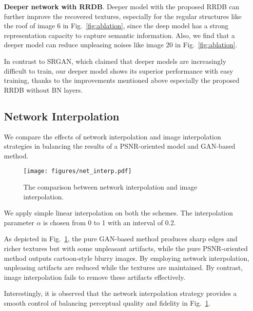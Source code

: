 \documentclass[runningheads]{llncs}
\begin{document}
\noindent \textbf{Deeper network with RRDB}.
Deeper model with the proposed RRDB can further improve the recovered textures, especially for the regular structures  
like the roof of image 6 in Fig.~\ref{fig:ablation}, since the deep model has a strong representation capacity to 
capture semantic information. 
Also, we find that a deeper model can reduce unpleasing noises like image 20 in Fig.~\ref{fig:ablation}.

In contrast to SRGAN, which claimed that deeper models are increasingly difficult to train, our deeper model  
shows its superior performance with easy training, thanks to the improvements mentioned above especially the proposed 
RRDB without BN layers.

\subsection{Network Interpolation} \label{subsec:exp_net_interp}

We compare the effects of network interpolation and image interpolation strategies in balancing the results of a 
PSNR-oriented model and GAN-based method.
\begin{figure}[htb]
	\begin{center}
		\texttt{[image: figures/net\_interp.pdf]}
	\end{center}
	\vspace{-0.4cm}
	\caption{The comparison between network interpolation and image interpolation.}
	\label{fig:net_interp}
	\vspace{-0.4cm}
\end{figure}
We apply simple linear interpolation on both the schemes.
%
The interpolation parameter $\alpha$ is chosen from 0 to 1 with an interval of 0.2. 


As depicted in Fig.~\ref{fig:net_interp}, the pure GAN-based method produces sharp edges and richer textures but with 
some unpleasant artifacts, while the pure PSNR-oriented method outputs cartoon-style blurry images.
%
By employing network interpolation, unpleasing artifacts are reduced while the textures are maintained. 
By contrast, image interpolation fails to remove these artifacts effectively.

Interestingly, it is observed that the network interpolation strategy provides a smooth control of balancing 
perceptual quality and fidelity in Fig.~\ref{fig:net_interp}.
\end{document}

